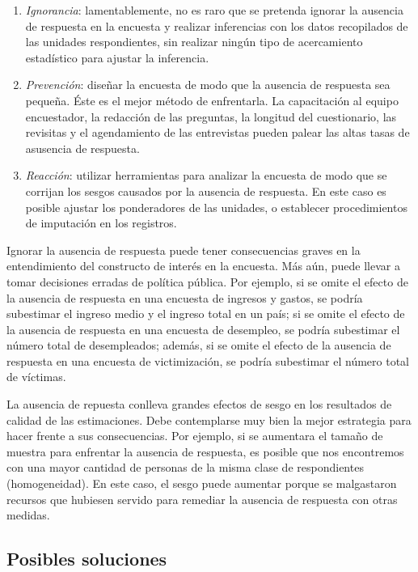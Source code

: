 \documentclass[
  10pt,
  spanish,
]{book}
\providecommand{\tightlist}{%
  \setlength{\itemsep}{0pt}\setlength{\parskip}{0pt}}
\begin{document}
\begin{enumerate}
\def\labelenumi{\arabic{enumi}.}
\tightlist
\item
  \emph{Ignorancia}: lamentablemente, no es raro que se pretenda ignorar la ausencia de respuesta en la encuesta y realizar inferencias con los datos recopilados de las unidades respondientes, sin realizar ningún tipo de acercamiento estadístico para ajustar la inferencia.
\item
  \emph{Prevención}: diseñar la encuesta de modo que la ausencia de respuesta sea pequeña. Éste es el mejor método de enfrentarla. La capacitación al equipo encuestador, la redacción de las preguntas, la longitud del cuestionario, las revisitas y el agendamiento de las entrevistas pueden palear las altas tasas de asusencia de respuesta.
\item
  \emph{Reacción}: utilizar herramientas para analizar la encuesta de modo que se corrijan los sesgos causados por la ausencia de respuesta. En este caso es posible ajustar los ponderadores de las unidades, o establecer procedimientos de imputación en los registros.
\end{enumerate}

Ignorar la ausencia de respuesta puede tener consecuencias graves en la entendimiento del constructo de interés en la encuesta. Más aún, puede llevar a tomar decisiones erradas de política pública. Por ejemplo, si se omite el efecto de la ausencia de respuesta en una encuesta de ingresos y gastos, se podría subestimar el ingreso medio y el ingreso total en un país; si se omite el efecto de la ausencia de respuesta en una encuesta de desempleo, se podría subestimar el número total de desempleados; además, si se omite el efecto de la ausencia de respuesta en una encuesta de victimización, se podría subestimar el número total de víctimas.

La ausencia de repuesta conlleva grandes efectos de sesgo en los resultados de calidad de las estimaciones. Debe contemplarse muy bien la mejor estrategia para hacer frente a sus consecuencias. Por ejemplo, si se aumentara el tamaño de muestra para enfrentar la ausencia de respuesta, es posible que nos encontremos con una mayor cantidad de personas de la misma clase de respondientes (homogeneidad). En este caso, el sesgo puede aumentar porque se malgastaron recursos que hubiesen servido para remediar la ausencia de respuesta con otras medidas.

\hypertarget{posibles-soluciones}{%
\subsection{Posibles soluciones}\label{posibles-soluciones}}
\end{document}
